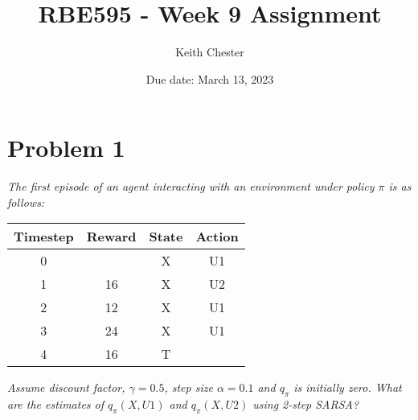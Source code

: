 \documentclass{article}
\title{RBE595 - Week 9 Assignment}
\author{Keith Chester}
\date{Due date: March 13, 2023}
\begin{document}
\maketitle


\section*{Problem 1}

\textit{The first episode of an agent interacting with an environment under policy $\pi$ is as follows:}

\begin{center}
    \begin{tabular}{ |c|c|c|c| }
        Timestep & Reward & State & Action \\
        \hline
        0        &        & X     & U1     \\
        1        & 16     & X     & U2     \\
        2        & 12     & X     & U1     \\
        3        & 24     & X     & U1     \\
        4        & 16     & T     &        \\
        \hline
    \end{tabular}
\end{center}

\textit{Assume discount factor, $\gamma=0.5$, step size $\alpha = 0.1$ and $q_\pi$ is initially zero. What are the estimates of $q_\pi(X, U1)$ and $q_\pi(X,U2)$ using 2-step SARSA?}

\begin{verbatim}

\end{verbatim}
\end{document}
